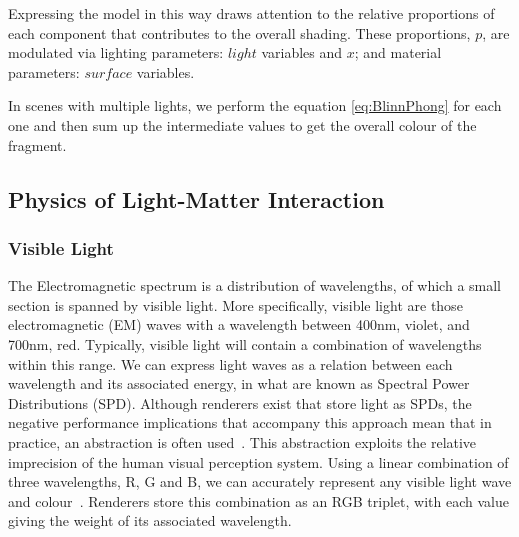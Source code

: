 Expressing the model in this way draws attention to the relative proportions of each component that contributes to the overall shading. These proportions, \begin{math}p\end{math}, are modulated via lighting parameters:  \begin{math}light\end{math} variables and \begin{math}x\end{math}; and material parameters: \begin{math}surface\end{math} variables.

In scenes with multiple lights, we perform the equation \ref{eq:BlinnPhong} for each one and then sum up the intermediate values to get the overall colour of the fragment.

\subsection{Physics of Light-Matter Interaction} \label{PhysicsOfLightMatterInteraction}

\subsubsection{Visible Light}

The Electromagnetic spectrum is a distribution of wavelengths, of which a small section is spanned by visible light. More specifically, visible light are those electromagnetic (EM) waves with a wavelength between 400nm, violet, and 700nm, red. Typically, visible light will contain a combination of wavelengths within this range. We can express light waves as a relation between each wavelength and its associated energy, in what are known as Spectral Power Distributions (SPD). Although renderers exist that store light as SPDs, the negative performance implications that accompany this approach mean that in practice, an abstraction is often used~\cite{SpectralRendering}. This abstraction exploits the relative imprecision of the human visual perception system. Using a linear combination of three wavelengths, R, G and B, we can accurately represent any visible light wave and colour~\cite{RGBColours}. Renderers store this combination as an RGB triplet, with each value giving the weight of its associated wavelength.

